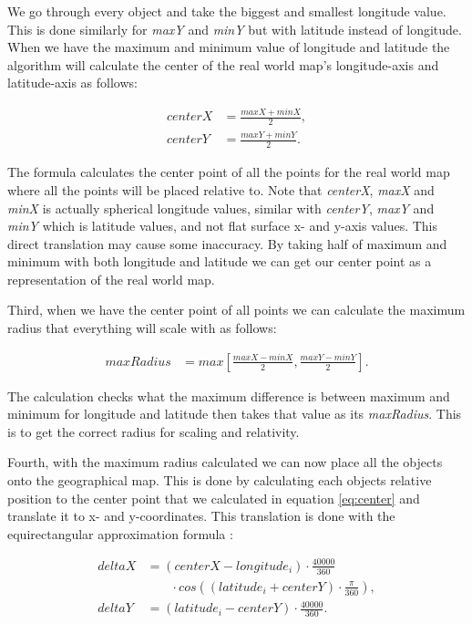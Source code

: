 We go through every object and take the biggest and smallest longitude value. This is done similarly for \textit{maxY} and \textit{minY} but with latitude instead of longitude. When we have the maximum and minimum value of longitude and latitude the algorithm will calculate the center of the real world map's longitude-axis and latitude-axis as follows:

\begin{align}
\label{eq:center}
centerX &= \frac{maxX+minX}{2},  \\
centerY &= \frac{maxY+minY}{2}. \nonumber
\end{align}

The formula calculates the center point of all the points for the real world map where all the points will be placed relative to. Note that \textit{centerX}, \textit{maxX} and \textit{minX} is actually spherical longitude values, similar with \textit{centerY}, \textit{maxY} and \textit{minY} which is latitude values, and not flat surface x- and y-axis values. This direct translation may cause some inaccuracy. By taking half of maximum and minimum with both longitude and latitude we can get our center point as a representation of the real world map.
 
Third, when we have the center point of all points we can calculate the maximum radius that everything will scale with as follows:

\begin{align}
\label{eq:radius}
maxRadius &= max[\frac{maxX-minX}{2}, \frac{maxY-minY}{2}].
\end{align}

The calculation checks what the maximum difference is between maximum and minimum for longitude and latitude then takes that value as its \textit{maxRadius}. This is to get the correct radius for scaling and relativity.

Fourth, with the maximum radius calculated we can now place all the objects onto the geographical map. This is done by calculating each objects relative position to the center point that we calculated in equation \ref{eq:center} and translate it to x- and y-coordinates. This translation is done with the equirectangular approximation formula \cite{equi}:

\begin{align}
\label{eq:equiretangular}
deltaX &= (centerX-longitude_i)\cdot\frac{40000}{360} \\
 &\phantom{b=\,} \cdot cos((latitude_i+centerY) \cdot \frac{\pi}{360}), \nonumber\\
deltaY &= (latitude_i-centerY)\cdot\frac{40000}{360}. \nonumber
\end{align}

